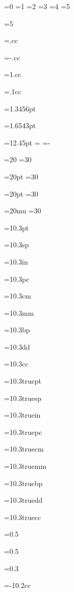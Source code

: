=0
=1
=2
=3
=4
=5

=5
\showthe{}

=.cc
\showthe{}

=-.cc
\showthe{}

=1.cc
\showthe{}

=.1cc
\showthe{}

=1.3456pt
\showthe{}

=1.6543pt
\showthe{}

=12.45pt
\showthe{}
=
\showthe{}
=-
\showthe{}

=20
=30
\showthe{}

=20pt
=30
\showthe{}

=20pt
=30
\showthe{}

=20mu
=30
\showthe{}

=10.3pt
\showthe{}

=10.3sp
\showthe{}

=10.3in
\showthe{}

=10.3pc
\showthe{}

=10.3cm
\showthe{}

=10.3mm
\showthe{}

=10.3bp
\showthe{}

=10.3dd
\showthe{}

=10.3cc
\showthe{}


=10.3truept
\showthe{}

=10.3truesp
\showthe{}

=10.3truein
\showthe{}

=10.3truepc
\showthe{}

=10.3truecm
\showthe{}

=10.3truemm
\showthe{}

=10.3truebp
\showthe{}

=10.3truedd
\showthe{}

=10.3truecc
\showthe{}

=0.5
\showthe{}

=0.5
\showthe{}

=0.3
\showthe{}

=-10.2cc
\showthe{}


